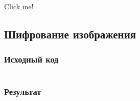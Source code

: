 \documentclass[12pt, a4paper]{article}
\begin{document}
\href{https://istupakov.ddns.net:4006/chat/message/3656c07a-c29a-4a02-b0f9-71d637159e41}{Click me!}

\subsection{Шифрование изображения}

\subsubsection{Исходный код}
\inputminted[firstline=82]{go}{/home/mehandes/go/src/github.com/meha4j/cry/pkg/aex/aex.go}

\subsubsection{Результат}
\end{document}
